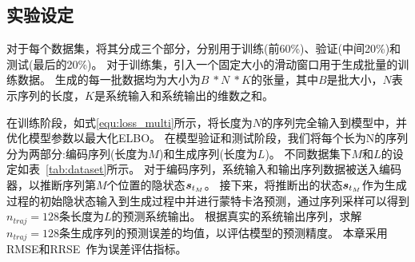 \subsection{实验设定}
对于每个数据集，将其分成三个部分，分别用于训练(前60\%)、验证(中间20\%)和测试(最后的20\%)。
对于训练集，引入一个固定大小的滑动窗口用于生成批量的训练数据。
生成的每一批数据均为大小为$B \ * N\ * K$的张量，其中$B$是批大小，$N$表示序列的长度，$K$是系统输入和系统输出的维数之和。

在训练阶段，如式\eqref{equ:loss_multi}所示，将长度为$N$的序列完全输入到模型中，并优化模型参数以最大化ELBO。
在模型验证和测试阶段，我们将每个长为N的序列分为两部分:编码序列(长度为$M$)和生成序列(长度为$L$)。
不同数据集下$M$和$L$的设定如表~\ref{tab:dataset}所示。
对于编码序列，系统输入和输出序列数据被送入编码器，以推断序列第$M$个位置的隐状态$\boldsymbol s_{t_M}$。
接下来，将推断出的状态$\boldsymbol s_{t_M}$作为生成过程的初始隐状态输入到生成过程中并进行蒙特卡洛预测，通过序列采样可以得到$n_{traj}=128$条长度为$L$的预测系统输出。
根据真实的系统输出序列，求解$n_{traj}=128$条生成序列的预测误差的均值，以评估模型的预测精度。
本章采用RMSE和RRSE~\cite{Demeester2019}作为误差评估指标。

